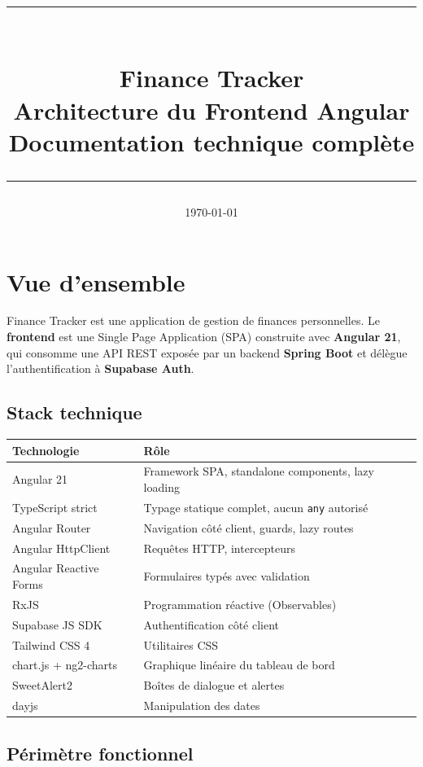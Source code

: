 \documentclass[12pt,a4paper]{article}
\title{
  \vspace{-1cm}
  {\color{primary}\rule{\linewidth}{2pt}}\\[0.5cm]
  {\LARGE\bfseries Finance Tracker}\\[0.3cm]
  {\large\bfseries Architecture du Frontend Angular}\\[0.2cm]
  {\normalsize Documentation technique complète}\\[0.5cm]
  {\color{primary}\rule{\linewidth}{2pt}}
}
\author{}
\date{\today}
\begin{document}
\maketitle
\thispagestyle{empty}
\tableofcontents
\newpage

\section{Vue d'ensemble}

Finance Tracker est une application de gestion de finances personnelles.
Le \textbf{frontend} est une Single Page Application (SPA) construite avec
\textbf{Angular 21}, qui consomme une API REST exposée par un backend
\textbf{Spring Boot} et délègue l'authentification à \textbf{Supabase Auth}.

\subsection{Stack technique}

\begin{center}
\begin{tabular}{L{4cm} L{9cm}}
\toprule
\textbf{Technologie} & \textbf{Rôle} \\
\midrule
Angular 21 & Framework SPA, standalone components, lazy loading \\
TypeScript strict & Typage statique complet, aucun \texttt{any} autorisé \\
Angular Router & Navigation côté client, guards, lazy routes \\
Angular HttpClient & Requêtes HTTP, intercepteurs \\
Angular Reactive Forms & Formulaires typés avec validation \\
RxJS & Programmation réactive (Observables) \\
Supabase JS SDK & Authentification côté client \\
Tailwind CSS 4 & Utilitaires CSS \\
chart.js + ng2-charts & Graphique linéaire du tableau de bord \\
SweetAlert2 & Boîtes de dialogue et alertes \\
dayjs & Manipulation des dates \\
\bottomrule
\end{tabular}
\end{center}

\subsection{Périmètre fonctionnel}
\end{document}
